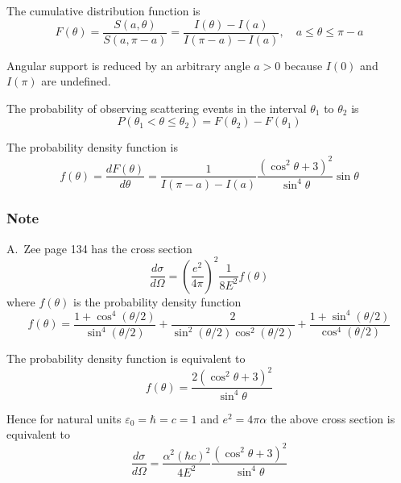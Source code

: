 The cumulative distribution function is
\begin{equation*}
F(\theta)
=\frac{S(a,\theta)}{S(a,\pi-a)}
=\frac{I(\theta)-I(a)}{I(\pi-a)-I(a)},
\quad
a\le\theta\le\pi-a
\end{equation*}

Angular support is reduced by an arbitrary angle $a>0$ because $I(0)$ and $I(\pi)$ are undefined.

\bigskip
The probability of observing scattering events in the interval $\theta_1$ to $\theta_2$ is
\begin{equation*}
P(\theta_1<\theta\le\theta_2)=F(\theta_2)-F(\theta_1)
\end{equation*}

The probability density function is
\begin{equation*}
f(\theta)=\frac{dF(\theta)}{d\theta}
=\frac{1}{I(\pi-a)-I(a)}
\frac{\left(\cos^2\theta+3\right)^2}{\sin^4\theta}\sin\theta
\end{equation*}

\subsubsection*{Note}

A.~Zee page 134 has the cross section
\begin{equation*}
\frac{d\sigma}{d\Omega}=\left(\frac{e^2}{4\pi}\right)^2\frac{1}{8E^2}f(\theta)
\end{equation*}
where $f(\theta)$ is the probability density function
\begin{equation*}
f(\theta)=
\frac{1+\cos^4(\theta/2)}{\sin^4(\theta/2)}
+\frac{2}{\sin^2(\theta/2)\cos^2(\theta/2)}
+\frac{1+\sin^4(\theta/2)}{\cos^4(\theta/2)}
\end{equation*}

The probability density function is equivalent to
\begin{equation*}
f(\theta)=\frac{2(\cos^2\theta+3)^2}{\sin^4\theta}
\end{equation*}

Hence for natural units $\varepsilon_0=\hbar=c=1$ and $e^2=4\pi\alpha$ the above cross section is equivalent to
\begin{equation*}
\frac{d\sigma}{d\Omega}=\frac{\alpha^2(\hbar c)^2}{4E^2}
\frac{(\cos^2\theta+3)^2}{\sin^4\theta}
\end{equation*}


